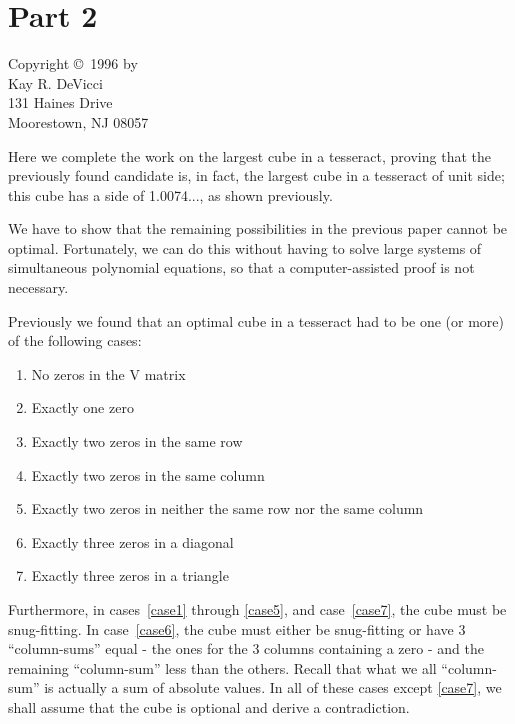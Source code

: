 \section*{Part 2}

\begin{center}
Copyright \copyright~1996 by \\
Kay R. DeVicci \\
131 Haines Drive \\
Moorestown, NJ  08057
\end{center}

Here we complete the work on the largest cube in a tesseract, proving that the
previously found candidate is, in fact, the largest cube in a tesseract of
unit side; this cube has a side of 1.0074..., as shown previously.

We have to show that the remaining possibilities in the previous
paper cannot be optimal. Fortunately, we can do this without having to
solve large systems of simultaneous polynomial equations, so that a
computer-assisted proof is not necessary.

Previously we found that an optimal cube in a tesseract had to be
one (or more) of the following cases:
\begin{enumerate}
\vspace{-0.1in}
\item{No zeros in the V matrix}
\label{case1}
\vspace{-0.1in}
\item{Exactly one zero}
\label{case2}
\vspace{-0.1in}
\item{Exactly two zeros in the same row}
\label{case3}
\vspace{-0.1in}
\item{Exactly two zeros in the same column}
\label{case4}
\vspace{-0.1in}
\item{Exactly two zeros in neither the same row nor the same column}
\label{case5}
\vspace{-0.1in}
\item{Exactly three zeros in a diagonal}
\label{case6}
\vspace{-0.1in}
\item{Exactly three zeros in a triangle}
\label{case7}
\end{enumerate}
Furthermore, in cases~\ref{case1} through \ref{case5}, and case~\ref{case7},
the cube must be snug-fitting.  In case~\ref{case6}, the cube must either be
snug-fitting or have 3 ``column-sums'' equal - the ones for the 3 columns
containing a zero - and the remaining ``column-sum'' less than the others.
Recall that what we all ``column-sum'' is actually a sum of absolute values.
In all of these cases except \ref{case7}, we shall assume that the cube is
optional and derive a contradiction.


